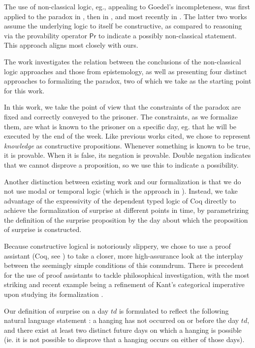 \documentclass[journal]{journal}
\begin{document}
The use of non-classical logic,
eg., appealing to Goedel's incompleteness, was first applied to the
paradox in \cite{goedelized}, then in \cite{godelinconsistent}, and most recently
in \cite{constructive} \cite{nonpredet}. The latter two works assume the underlying logic to itself be
constructive, as compared to reasoning via the provability operator $\mathsf{Pr}$ to indicate
a possibly non-classical statement. This approach aligns most closely with ours.

The work \cite{fourpossible} investigates the relation between the conclusions
of the non-classical logic approaches and those from epistemology, as well
as presenting four distinct approaches to formalizing the paradox, two of which
we take as the starting point for this work.

In this work, we take the point of view that the constraints of the paradox are
fixed and correctly conveyed to the prisoner. The constraints, as we formalize them,
are what is known to the prisoner on a specific day, eg. that he will be executed
by the end of the week. Like previous works cited, we chose to represent
\emph{knowledge} as constructive propositions. Whenever something is known to be
true, it is provable. When it is false, its negation is provable. Double negation
indicates that we cannot disprove a proposition, so we use this to indicate a
possibility.

Another distinction between existing work and our formalization is that
we do not use modal or temporal logic (which is the approach in \cite{modalepistemic}).
Instead, we take advantage of the expressivity of the dependent typed logic of Coq directly to
achieve the formalization of surprise at different points in time,
by parametrizing the definition of the surprise proposition
by the day about which the proposition of surprise is constructed.

Because constructive logical is notoriously slippery, we chose to use a proof
assistant (Coq, see \cite{coqmanual}) to take a closer, more high-assurance look at the
interplay between the seemingly simple conditions of this conundrum.
There is precedent for the use of proof assistants to tackle philosophical
investigation, with the most striking and recent example
being a refinement of Kant's categorical imperative upon studying its
formalization \cite{categoricalkant}.

Our definition of surprise on a day $td$ is formulated to reflect
the following natural language statement : a hanging has not occurred on or before the day $td$,
and there exist at least two distinct future days on which a hanging
is possible (ie. it is not possible to disprove that a hanging occurs on either
of those days).
\end{document}
